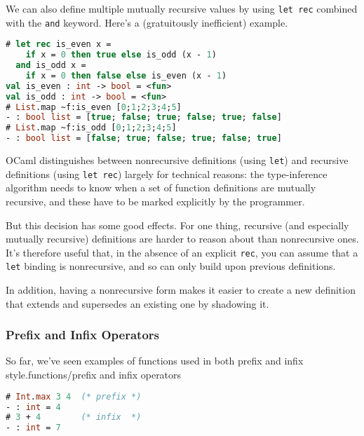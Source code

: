 We can also define multiple mutually recursive values by using
\passthrough{\lstinline!let rec!} combined with the
\passthrough{\lstinline!and!} keyword. Here's a (gratuitously
inefficient) example.

\begin{lstlisting}[language=Caml]
# let rec is_even x =
    if x = 0 then true else is_odd (x - 1)
  and is_odd x =
    if x = 0 then false else is_even (x - 1)
val is_even : int -> bool = <fun>
val is_odd : int -> bool = <fun>
# List.map ~f:is_even [0;1;2;3;4;5]
- : bool list = [true; false; true; false; true; false]
# List.map ~f:is_odd [0;1;2;3;4;5]
- : bool list = [false; true; false; true; false; true]
\end{lstlisting}

OCaml distinguishes between nonrecursive definitions (using
\passthrough{\lstinline!let!}) and recursive definitions (using
\passthrough{\lstinline!let rec!}) largely for technical reasons: the
type-inference algorithm needs to know when a set of function
definitions are mutually recursive, and these have to be marked
explicitly by the programmer.

But this decision has some good effects. For one thing, recursive (and
especially mutually recursive) definitions are harder to reason about
than nonrecursive ones. It's therefore useful that, in the absence of an
explicit \passthrough{\lstinline!rec!}, you can assume that a
\passthrough{\lstinline!let!} binding is nonrecursive, and so can only
build upon previous definitions.

In addition, having a nonrecursive form makes it easier to create a new
definition that extends and supersedes an existing one by shadowing it.

\hypertarget{prefix-and-infix-operators}{%
\subsubsection{Prefix and Infix
Operators}\label{prefix-and-infix-operators}}

So far, we've seen examples of functions used in both prefix and infix
style.\protect\hypertarget{FNCprf}{}{functions/prefix
and infix operators}

\begin{lstlisting}[language=Caml]
# Int.max 3 4  (* prefix *)
- : int = 4
# 3 + 4        (* infix  *)
- : int = 7
\end{lstlisting}

